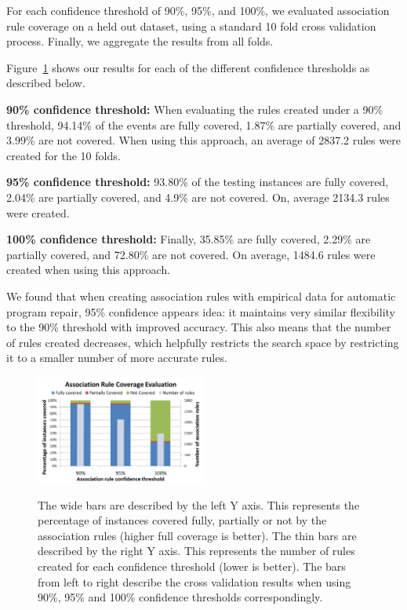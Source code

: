 \documentclass[sigconf]{acmart}
\begin{document}
For each confidence
threshold of 90\%, 95\%, and 100\%, we evaluated association rule coverage on a held out
dataset, using 
a standard 10 fold cross validation process. Finally, we aggregate the results
from all folds.

Figure~\ref{ruleEvaluation} shows our results for each of the 
different confidence thresholds as described below.

\vspace{0.5em}
\noindent\textbf{90\% confidence threshold:}
When evaluating the rules created under a 90\% threshold, 94.14\% of the 
events are fully covered, 1.87\% are partially covered, and 3.99\% are
not covered. When using this approach, an average of 2837.2 rules were
created for the 10 folds.

\vspace{0.5em}
\noindent\textbf{95\% confidence threshold:}
93.80\% of the testing instances are fully covered, 2.04\% are
partially covered, and 4.9\% are not covered. On, average 2134.3 rules
were created.

\vspace{0.5em}
\noindent\textbf{100\% confidence threshold:}
Finally, 35.85\% are fully
covered, 2.29\% are partially covered, and 72.80\% are not covered.
On average, 1484.6 rules were created when using this approach.

\vspace{0.5em}
We found that when creating association
rules with empirical data for automatic program repair, 95\% confidence appears
idea: 
it maintains very similar flexibility 
to the 90\% threshold with improved accuracy.
This also means that the number of rules created decreases, which helpfully
restricts 
the search space by restricting it to a smaller number of more accurate rules.
 

\begin{figure}[h]
\caption{The wide bars are described by the left Y axis. This represents
the percentage of instances covered
fully, partially or not by the association rules (higher full coverage is better). 
The thin bars are described by the right Y axis.
This represents the number of rules created for each confidence threshold 
(lower is better).
The bars from left to right describe the cross validation
results when using 90\%, 95\% and 100\% confidence thresholds correspondingly.}
\centering
\includegraphics[width=0.5\textwidth]{images/assocRuleEval.png}
\label{ruleEvaluation}
\end{figure}
\end{document}
